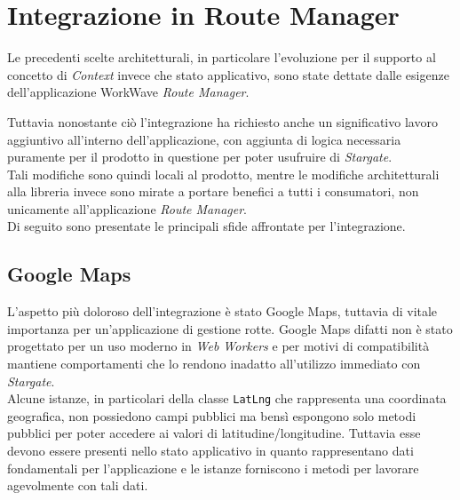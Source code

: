 
\chapter{Integrazione in Route Manager}
\label{cap:integrazione}

Le precedenti scelte architetturali, in particolare l'evoluzione per il supporto al concetto di \textit{Context} invece che stato applicativo, sono state dettate dalle esigenze dell'applicazione WorkWave \textit{Route Manager}. 

Tuttavia nonostante ciò l'integrazione ha richiesto anche un significativo lavoro aggiuntivo all'interno dell'applicazione, con aggiunta di logica necessaria puramente per il prodotto in questione per poter usufruire di \textit{Stargate}. \\

Tali modifiche sono quindi locali al prodotto, mentre le modifiche architetturali alla libreria invece sono mirate a portare benefici a tutti i consumatori, non unicamente all'applicazione \textit{Route Manager}. \\

Di seguito sono presentate le principali sfide affrontate per l'integrazione.

\section{Google Maps}

L'aspetto più doloroso dell'integrazione è stato Google Maps, tuttavia di vitale importanza per un'applicazione di gestione rotte. Google Maps difatti non è stato progettato per un uso moderno in \textit{Web Workers} e per motivi di compatibilità mantiene comportamenti che lo rendono inadatto all'utilizzo immediato con \textit{Stargate}. \\

Alcune istanze, in particolari della classe \texttt{LatLng} che rappresenta una coordinata geografica, non possiedono campi pubblici ma bensì espongono solo metodi pubblici per poter accedere ai valori di latitudine/longitudine. Tuttavia esse devono essere presenti nello stato applicativo in quanto rappresentano dati fondamentali per l'applicazione e le istanze forniscono i metodi per lavorare agevolmente con tali dati. \\

